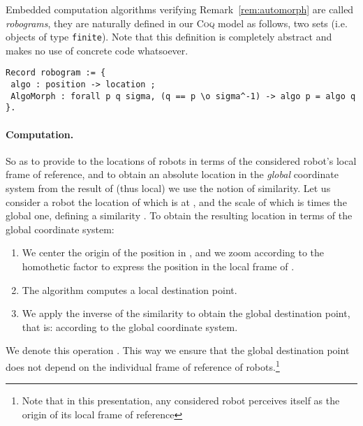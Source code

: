 \documentclass[11pt,a4]{llncs}
\newcommand{\x}{\xspace}
\newcommand{\coq}{\textsc{Coq}\x}
\begin{document}
Embedded computation algorithms verifying Remark~\ref{rem:automorph}
are called \emph{robograms}, they are naturally defined in our \coq
model as follows, two sets (i.e. objects of type
\lstinline!finite!).
Note that this definition is completely abstract and makes no use of
concrete code whatsoever.
\begin{lstlisting}
Record robogram := {
 algo : position -> location ;
 AlgoMorph : forall p q sigma, (q == p \o sigma^-1) -> algo p = algo q }.
\end{lstlisting}

\paragraph*{Computation.}\label{sec:formal-computation}

So as to provide to  the locations of robots in terms of the
considered robot's local frame of reference, and to obtain an absolute
location in the \emph{global} coordinate system from
the result of  (thus local) we use the notion of similarity.  Let
us consider a robot  the location of which is at , and
the scale of which is  times the global one, defining a
similarity . To obtain the resulting location in terms of
the global coordinate system:
\begin{enumerate}
\item We center the origin of the position in , and
we zoom according to the homothetic factor  to express the
  position in 
  the local frame of  .
\item The algorithm  computes a local destination point.
\item We apply the inverse of the similarity to obtain the global destination
  point, that is: according to the global coordinate system.
\end{enumerate}
We denote this operation .
This way we ensure that the global destination point does not depend
on the individual frame of reference of robots.\footnote{Note that in this
  presentation, any considered robot perceives itself as the origin of
  its local frame of reference}
\end{document}
